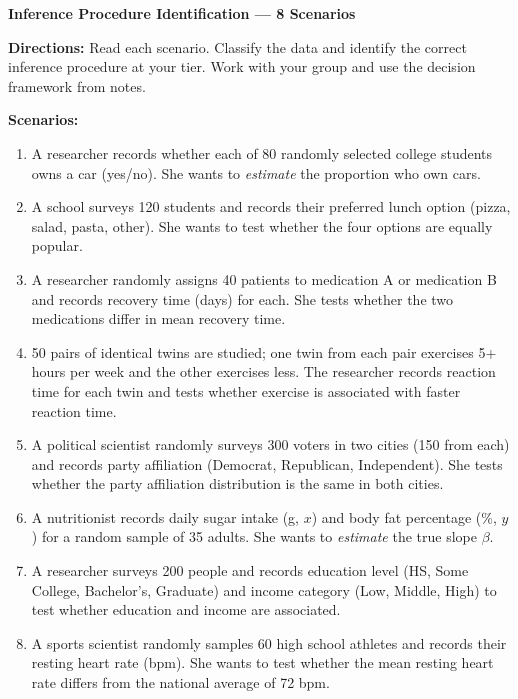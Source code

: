 \documentclass[10pt]{article}
\begin{document}
\namepartnerperiod

\vspace{0.1in}
\textbf{Inference Procedure Identification --- 8 Scenarios}

\textbf{Directions:} Read each scenario. Classify the data and identify the correct inference
procedure at your tier. Work with your group and use the decision framework from notes.

\vspace{0.1in}

\textbf{Scenarios:}
\begin{enumerate}[itemsep=4pt]
  \item A researcher records whether each of 80 randomly selected college students owns a car
        (yes/no). She wants to \textit{estimate} the proportion who own cars.
  \item A school surveys 120 students and records their preferred lunch option (pizza, salad,
        pasta, other). She wants to test whether the four options are equally popular.
  \item A researcher randomly assigns 40 patients to medication A or medication B and records
        recovery time (days) for each. She tests whether the two medications differ in mean
        recovery time.
  \item 50 pairs of identical twins are studied; one twin from each pair exercises 5+ hours per
        week and the other exercises less. The researcher records reaction time for each twin
        and tests whether exercise is associated with faster reaction time.
  \item A political scientist randomly surveys 300 voters in two cities (150 from each) and
        records party affiliation (Democrat, Republican, Independent). She tests whether the
        party affiliation distribution is the same in both cities.
  \item A nutritionist records daily sugar intake (g, $x$) and body fat percentage (\%, $y$)
        for a random sample of 35 adults. She wants to \textit{estimate} the true slope $\beta$.
  \item A researcher surveys 200 people and records education level (HS, Some College,
        Bachelor's, Graduate) and income category (Low, Middle, High) to test whether
        education and income are associated.
  \item A sports scientist randomly samples 60 high school athletes and records their resting
        heart rate (bpm). She wants to test whether the mean resting heart rate differs from
        the national average of 72 bpm.
\end{enumerate}
\end{document}
